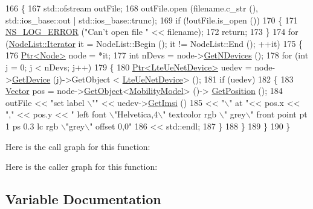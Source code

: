 \begin{DoxyCode}
166 \{
167   std::ofstream outFile;
168   outFile.open (filename.c\_str (), std::ios\_base::out | std::ios\_base::trunc);
169   \textcolor{keywordflow}{if} (!outFile.is\_open ())
170     \{
171       \hyperlink{group__logging_ga0261a8db1d4ac5f79417d117634fd455}{NS\_LOG\_ERROR} (\textcolor{stringliteral}{"Can't open file "} << filename);
172       \textcolor{keywordflow}{return};
173     \}
174   \textcolor{keywordflow}{for} (\hyperlink{classns3_1_1NodeList_a9e2679a94efb4f0066cc21e65440364d}{NodeList::Iterator} it = NodeList::Begin (); it != NodeList::End (); ++it)
175     \{
176       \hyperlink{classns3_1_1Ptr}{Ptr<Node>} node = *it;
177       \textcolor{keywordtype}{int} nDevs = node->\hyperlink{classns3_1_1Node_a531554d2241ba4fa1cd74e3360be6bce}{GetNDevices} ();
178       \textcolor{keywordflow}{for} (\textcolor{keywordtype}{int} j = 0; j < nDevs; j++)
179         \{
180           \hyperlink{classns3_1_1Ptr}{Ptr<LteUeNetDevice>} uedev = node->\hyperlink{classns3_1_1Node_a5918dfd24ef632efc9a83a5f6561c76e}{GetDevice} (j)->GetObject <
      \hyperlink{classns3_1_1LteUeNetDevice}{LteUeNetDevice}> ();
181           \textcolor{keywordflow}{if} (uedev)
182             \{
183               \hyperlink{classns3_1_1Vector3D_a7e59b47bc94c9cb1dadff68c1d0112d8}{Vector} pos = node->\hyperlink{classns3_1_1Object_a13e18c00017096c8381eb651d5bd0783}{GetObject}<\hyperlink{classns3_1_1MobilityModel}{MobilityModel}> ()->
      \hyperlink{lena-cqi-threshold_8cc_acebf763e1a0478cec225f9547941ae54}{GetPosition} ();
184               outFile << \textcolor{stringliteral}{"set label \(\backslash\)""} << uedev->\hyperlink{classns3_1_1LteUeNetDevice_a673405bfed4b45c5714f17b0c3bad334}{GetImsi} ()
185                       << \textcolor{stringliteral}{"\(\backslash\)" at "}<< pos.x << \textcolor{stringliteral}{","} << pos.y << \textcolor{stringliteral}{" left font \(\backslash\)"Helvetica,4\(\backslash\)" textcolor rgb \(\backslash\)"
      grey\(\backslash\)" front point pt 1 ps 0.3 lc rgb \(\backslash\)"grey\(\backslash\)" offset 0,0"}
186                       << std::endl;
187             \}
188         \}
189     \}
190 \}
\end{DoxyCode}


Here is the call graph for this function\+:




Here is the caller graph for this function\+:




\subsection{Variable Documentation}
